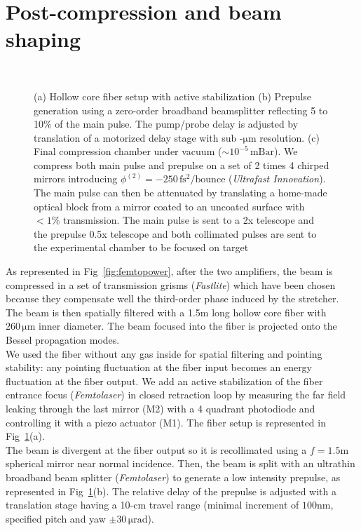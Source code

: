 \section{Post-compression and beam shaping}

\begin{figure}[H]
\centering
{}\\
\caption{\label{fig:PostComp_chamber} (a) Hollow core fiber setup with active stabilization (b) Prepulse generation using a zero-order broadband beamsplitter reflecting 5 to 10\% of the main pulse. The pump/probe delay is adjusted by translation of a motorized delay stage with sub -$\mathrm{\mu m}$ resolution. (c) Final compression chamber under vacuum ($\sim 10^{-5}\,\mathrm{mBar}$). We compress both main pulse and prepulse on a set of 2 times 4 chirped mirrors introducing $\phi^{(2)} = -250\,\mathrm{fs^2/bounce}$ (\textit{Ultrafast Innovation}). The main pulse can then be attenuated by translating a home-made optical block from a mirror coated to an uncoated surface with $<1\%$ transmission. The main pulse is sent to a 2x telescope and the prepulse 0.5x telescope and both collimated pulses are sent to the experimental chamber to be focused on target}
\end{figure}

As represented in Fig~\ref{fig:femtopower}, after the two amplifiers, the beam is compressed in a set of transmission grisms (\textit{Fastlite}) which have been chosen because they compensate well the third-order phase induced by the stretcher. The beam is then spatially filtered with a 1.5m long hollow core fiber with $260\,\mathrm{\mu m}$ inner diameter. The beam focused into the fiber is projected onto the Bessel propagation modes. \\


\noindent  We used the fiber without any gas inside for spatial filtering and pointing stability: any pointing fluctuation at the fiber input becomes an energy fluctuation at the fiber output. We add an active stabilization of the fiber entrance focus (\textit{Femtolaser}) in closed retraction loop by measuring the far field leaking through the last mirror (M2) with a 4 quadrant photodiode and controlling it with a piezo actuator (M1). The fiber setup is represented in Fig~\ref{fig:PostComp_chamber}(a). \\




\noindent  The beam is divergent at the fiber output so it is recollimated using a $f=1.5$m spherical mirror near normal incidence. Then, the beam is split with an ultrathin broadband beam splitter (\textit{Femtolaser}) to generate a low intensity prepulse, as represented  in Fig~\ref{fig:PostComp_chamber}(b).
The relative delay of the prepulse is adjusted with a translation stage having a 10-cm travel range (minimal increment of $100$nm, specified pitch and yaw $\pm30\,\mathrm{\mu rad}$).\\


